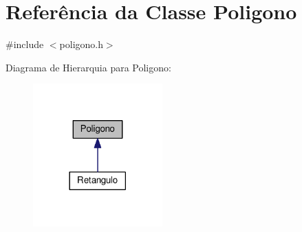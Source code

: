 \hypertarget{class_poligono}{}\section{Referência da Classe Poligono}
\label{class_poligono}


{\ttfamily \#include $<$poligono.\+h$>$}



Diagrama de Hierarquia para Poligono\+:\nopagebreak
\begin{figure}[H]
\begin{center}
\leavevmode
\includegraphics[width=141pt]{class_poligono__inherit__graph}
\end{center}
\end{figure}
